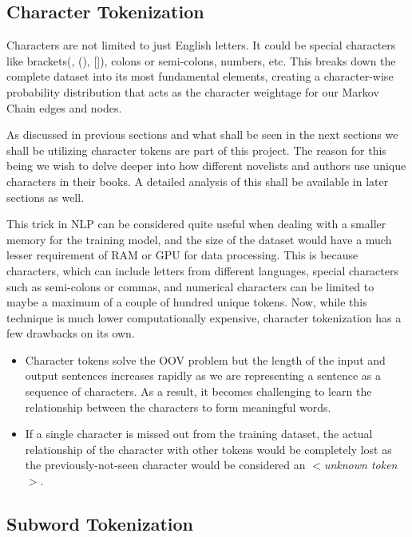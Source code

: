 \subsection{Character Tokenization} %
\label{sec:token_characters} %

Characters are not limited to just English letters. It could be special characters like brackets({}, (), []), colons or semi-colons, numbers, etc. This breaks down the complete dataset into its most fundamental elements, creating a character-wise probability distribution that acts as the character weightage for our Markov Chain edges and nodes.

As discussed in previous sections and what shall be seen in the next sections we shall be utilizing character tokens are part of this project. The reason for this being we wish to delve deeper into how different novelists and authors use unique characters in their books. A detailed analysis of this shall be available in later sections as well. 

This trick in NLP can be considered quite useful when dealing with a smaller memory for the training model, and the size of the dataset would have a much lesser requirement of RAM or GPU for data processing. This is because characters, which can include letters from different languages, special characters such as semi-colons or commas, and numerical characters can be limited to maybe a maximum of a couple of hundred unique tokens.
Now, while this technique is much lower computationally expensive, character tokenization has a few drawbacks on its own.

\begin{itemize}
    \item Character tokens solve the OOV problem but the length of the input and output sentences increases rapidly as we are representing a sentence as a sequence of characters. As a result, it becomes challenging to learn the relationship between the characters to form meaningful words.
    \item If a single character is missed out from the training dataset, the actual relationship of the character with other tokens would be completely lost as the previously-not-seen character would be considered an \textit{$<$unknown token$>$}.
\end{itemize}

\subsection{Subword Tokenization}
\label{sec:token_subwords}

